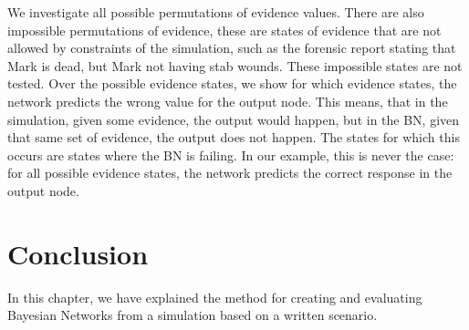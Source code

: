 \begin{enumerate}
We investigate all possible permutations of evidence values. There are also impossible permutations of evidence, these are states of evidence that are not allowed by constraints of the simulation, such as the forensic report stating that Mark is dead, but Mark not having stab wounds. These impossible states are not tested. Over the possible evidence states, we show for which evidence states, the network predicts the wrong value for the output node. This means, that in the simulation, given some evidence, the output would happen, but in the BN, given that same set of evidence, the output does not happen. The states for which this occurs are states where the BN is failing. In our example, this is never the case: for all possible evidence states, the network predicts the correct response in the output node.

\end{enumerate}

\section{Conclusion}

In this chapter, we have explained the method for creating and evaluating Bayesian Networks from a simulation based on a written scenario.
